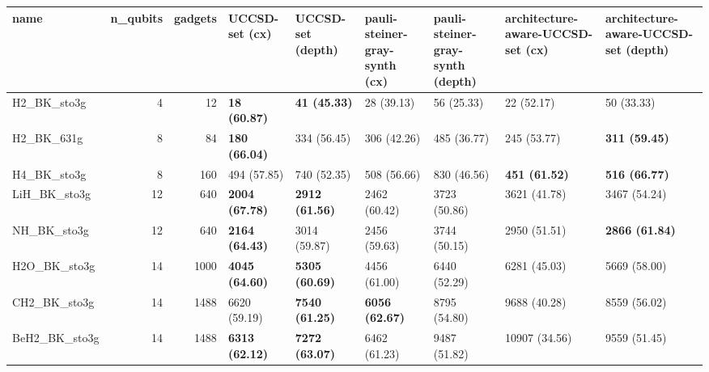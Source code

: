 \begin{tabular}{lrrllllll}
\toprule
name & n\_qubits & gadgets & UCCSD-set (cx) & UCCSD-set (depth) & pauli-steiner-gray-synth (cx) & pauli-steiner-gray-synth (depth) & architecture-aware-UCCSD-set (cx) & architecture-aware-UCCSD-set (depth) \\
\midrule
H2\_BK\_sto3g & 4 & 12 & \textbf{18 (60.87)} & \textbf{41 (45.33)} & 28 (39.13) & 56 (25.33) & 22 (52.17) & 50 (33.33) \\
H2\_BK\_631g & 8 & 84 & \textbf{180 (66.04)} & 334 (56.45) & 306 (42.26) & 485 (36.77) & 245 (53.77) & \textbf{311 (59.45)} \\
H4\_BK\_sto3g & 8 & 160 & 494 (57.85) & 740 (52.35) & 508 (56.66) & 830 (46.56) & \textbf{451 (61.52)} & \textbf{516 (66.77)} \\
LiH\_BK\_sto3g & 12 & 640 & \textbf{2004 (67.78)} & \textbf{2912 (61.56)} & 2462 (60.42) & 3723 (50.86) & 3621 (41.78) & 3467 (54.24) \\
NH\_BK\_sto3g & 12 & 640 & \textbf{2164 (64.43)} & 3014 (59.87) & 2456 (59.63) & 3744 (50.15) & 2950 (51.51) & \textbf{2866 (61.84)} \\
H2O\_BK\_sto3g & 14 & 1000 & \textbf{4045 (64.60)} & \textbf{5305 (60.69)} & 4456 (61.00) & 6440 (52.29) & 6281 (45.03) & 5669 (58.00) \\
CH2\_BK\_sto3g & 14 & 1488 & 6620 (59.19) & \textbf{7540 (61.25)} & \textbf{6056 (62.67)} & 8795 (54.80) & 9688 (40.28) & 8559 (56.02) \\
BeH2\_BK\_sto3g & 14 & 1488 & \textbf{6313 (62.12)} & \textbf{7272 (63.07)} & 6462 (61.23) & 9487 (51.82) & 10907 (34.56) & 9559 (51.45) \\
\bottomrule
\end{tabular}
